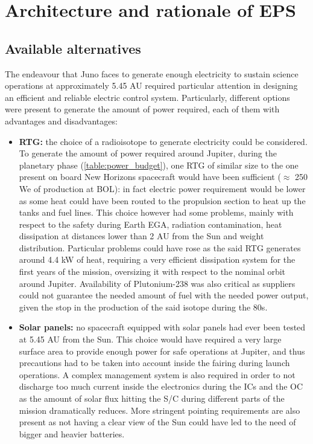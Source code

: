 \section{Architecture and rationale of EPS}
\label{sec:EPS_architecture_rationale}

\subsection{Available alternatives}
\label{subsec:available_alternatives}

The endeavour that Juno faces to generate enough electricity to sustain science operations at approximately 5.45 AU required particular attention in designing an efficient and reliable electric control system. Particularly, different options were present to generate the amount of power required, each of them with advantages and disadvantages:

\begin{itemize}
    \item \textbf{RTG:} the choice of a radioisotope to generate electricity could be considered. To generate the amount of power required around Jupiter, during the planetary phase (\autoref{table:power_budget}), one RTG of similar size to the one present on board New Horizons spacecraft  would have been sufficient ($\approx$ 250 We of production at BOL):\cite{nh_rtg} in fact electric power requirement would be lower as some heat could have been routed to the propulsion section to heat up the tanks and fuel lines. This choice however had some problems, mainly with respect to the safety during Earth EGA, radiation contamination, heat dissipation at distances lower than 2 AU from the Sun and weight distribution. Particular problems could have rose as the said RTG generates around 4.4 kW of heat, requiring a very efficient dissipation system for the first years of the mission, oversizing it with respect to the nominal orbit around Jupiter. Availability of Plutonium-238 was also critical as suppliers could not guarantee the needed amount of fuel with the needed power output, given the stop in the production of the said isotope during the 80s.\cite{plutonium}
    
    \item \textbf{Solar panels:} no spacecraft equipped with solar panels had ever been tested at 5.45 AU from the Sun. This choice would have required a very large surface area to provide enough power for safe operations at Jupiter, and thus precautions had to be taken into account inside the fairing during launch operations. A complex management system is also required in order to not discharge too much current inside the electronics during the ICs and the OC as the amount of solar flux hitting the S/C during different parts of the mission dramatically reduces. More stringent pointing requirements are also present as not having a clear view of the Sun could have led to the need of bigger and heavier batteries.
\end{itemize}

